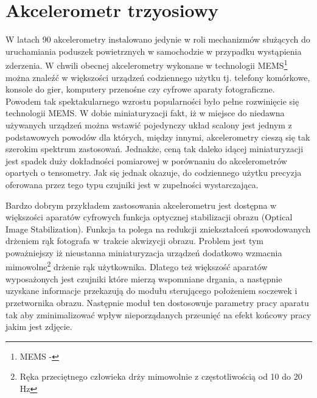 \section{Akcelerometr trzyosiowy}
W latach 90 akcelerometry instalowano jedynie w roli mechanizmów służących do
uruchamiania poduszek powietrznych w samochodzie w przypadku wystąpienia
zderzenia. W chwili obecnej akcelerometry wykonane w technologii
MEMS\footnote{MEMS - } 
można znaleźć w większości urządzeń codziennego użytku tj.
telefony komórkowe, konsole do gier, komputery przenośne czy cyfrowe aparaty
fotograficzne. Powodem tak spektakularnego wzrostu popularności było pełne
rozwinięcie się technologii MEMS. W dobie miniaturyzacji fakt, iż w miejsce do
niedawna używanych urządzeń można wstawić pojedynczy układ
scalony jest jednym z podstawowych powodów dla których, między innymi,
akcelerometry cieszą się tak szerokim spektrum zastosowań. Jednakże, ceną tak
daleko idącej miniaturyzacji jest spadek duży dokładności pomiarowej w
porównaniu do akcelerometrów opartych o tensometry. Jak się jednak okazuje, do
codziennego użytku precyzja oferowana przez tego typu czujniki jest w zupełności wystarczająca.

Bardzo dobrym przykładem zastosowania akcelerometru jest dostępna w większości
aparatów cyfrowych funkcja optycznej stabilizacji obrazu (Optical Image
Stabilization). Funkcja ta polega na redukcji zniekształceń  spowodowanych
drżeniem rąk fotografa w~trakcie akwizycji obrazu. Problem jest tym poważniejszy
iż nieustanna miniaturyzacja urządzeń dodatkowo wzmacnia mimowolne\footnote{Ręka
przeciętnego człowieka drży mimowolnie z częstotliwością od 10 do 20 Hz} drżenie
rąk użytkownika. Dlatego też większość aparatów wyposażonych jest czujniki które
mierzą wspomniane drgania, a następnie uzyskane informacje przekazują do modułu
sterującego położeniem soczewek i przetwornika obrazu. Następnie moduł ten
dostosowuje parametry pracy aparatu tak aby zminimalizować wpływ nieporządanych przeunięć
na efekt końcowy pracy jakim jest zdjęcie.

